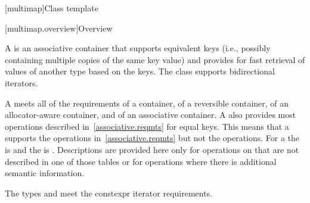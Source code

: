 [multimap]{Class template }

[multimap.overview]{Overview}

\pnum
{}%
A
is an associative container that supports equivalent keys (i.e., possibly containing multiple copies of
the same key value) and provides for fast retrieval of values of another type
based on the keys.
The
class
supports bidirectional iterators.

\pnum
A  meets all of the requirements
of a container,
of a reversible container,
of an allocator-aware container, and
of an associative container.
A
also provides most operations described in~\ref{associative.reqmts}
for equal keys.
This means that a
supports the
operations in~\ref{associative.reqmts}
but not the
operations.
For a
the
is
and the
is
.
Descriptions are provided here only for operations on
that are not described in one of those tables
or for operations where there is additional semantic information.

\pnum
The types  and  meet
the constexpr iterator requirements.

